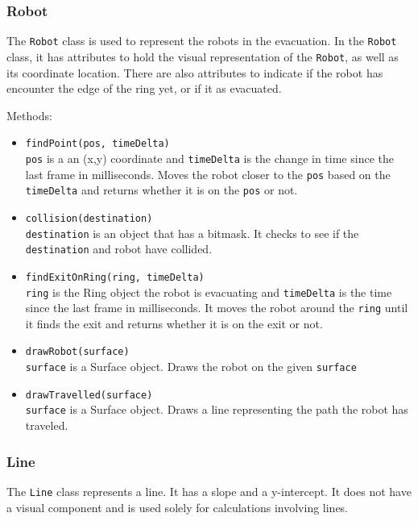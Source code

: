 \documentclass[12pt,letterpaper]{article}
\begin{document}
    \subsubsection{Robot}
        The \texttt{Robot} class is used to represent the robots in the evacuation. In the \texttt{Robot} class, it has attributes to hold the visual representation of the \texttt{Robot}, as well as its coordinate location. There are also attributes to indicate if the robot has encounter the edge of the ring yet, or if it as evacuated.
        
        \noindent Methods:
        \begin{itemize}
            \item \texttt{findPoint(pos, timeDelta)} \\
                \texttt{pos} is a an (x,y) coordinate and \texttt{timeDelta} is the change in time since the last frame in milliseconds. Moves the robot closer to the \texttt{pos} based on the \texttt{timeDelta} and returns whether it is on the \texttt{pos} or not.
            \item \texttt{collision(destination)} \\
                \texttt{destination} is an object that has a bitmask. It checks to see if the \texttt{destination} and robot have collided.
            \item \texttt{findExitOnRing(ring, timeDelta)} \\
                \texttt{ring} is the Ring object the robot is evacuating and \texttt{timeDelta} is the time since the last frame in milliseconds. It moves the robot around the \texttt{ring} until it finds the exit and returns whether it is on the exit or not.
            \item \texttt{drawRobot(surface)} \\
                \texttt{surface} is a Surface object. Draws the robot on the given \texttt{surface}
            \item \texttt{drawTravelled(surface)} \\
                \texttt{surface} is a Surface object. Draws a line representing the path the robot has traveled.
        \end{itemize}

    \subsubsection{Line}
        The \texttt{Line} class represents a line. It has a slope and a y-intercept. It does not have a visual component and is used solely for calculations involving lines.
    
\end{document}
